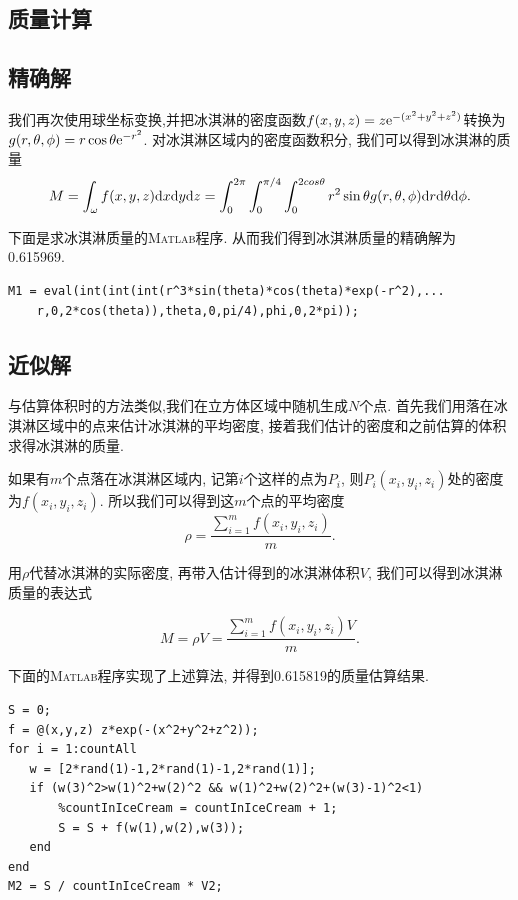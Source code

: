 \documentclass[a4paper,12pt]{article}
\begin{document}
\begin{CJK*}{UTF8}{gbsn}
\section{质量计算}
\subsection{精确解}
我们再次使用球坐标变换,并把冰淇淋的密度函数$f(x,y,z)=z{\rm e}^{-(x^2+y^2+z^2)}$转换为$g(r,\theta,\phi)=r\cos{\theta}{\rm e}^{-r^2}$. 对冰淇淋区域内的密度函数积分, 我们可以得到冰淇淋的质量
\begin{equation*}
M=\int^{}_{\omega}f(x,y,z){\rm d}x{\rm d}y{\rm d}z=\int^{2\pi}_{0}\int^{\pi/4}_{0}\int^{2cos{\theta}}_{0}r^2\sin{\theta}g(r,\theta,\phi){\rm d}r{\rm d}\theta{\rm d}\phi.
\end{equation*}\par
下面是求冰淇淋质量的\textsc{Matlab}程序. 从而我们得到冰淇淋质量的精确解为0.615969.\par\vspace{-15pt}
\begin{lstlisting}
M1 = eval(int(int(int(r^3*sin(theta)*cos(theta)*exp(-r^2),...
    r,0,2*cos(theta)),theta,0,pi/4),phi,0,2*pi));
\end{lstlisting}\par

\subsection{近似解}
与估算体积时的方法类似,我们在立方体区域中随机生成$N$个点. 首先我们用落在冰淇淋区域中的点来估计冰淇淋的平均密度, 接着我们估计的密度和之前估算的体积求得冰淇淋的质量.\par
如果有$m$个点落在冰淇淋区域内, 记第$i$个这样的点为$P_i$, 则$P_i(x_i,y_i,z_i)$处的密度为$f(x_i,y_i,z_i)$. 所以我们可以得到这$m$个点的平均密度
\begin{equation*}
\rho=\frac{\sum_{i=1}^{m}f(x_i,y_i,z_i)}{m}.
\end{equation*}\par
用$\rho$代替冰淇淋的实际密度, 再带入估计得到的冰淇淋体积$V$, 我们可以得到冰淇淋质量的表达式\par
\begin{equation*}
M=\rho V=\frac{\sum_{i=1}^{m}f(x_i,y_i,z_i)V}{m}.
\end{equation*}\par\vspace{5pt}
\noindent 下面的\textsc{Matlab}程序实现了上述算法, 并得到0.615819的质量估算结果.\par\vspace{-15pt}
\begin{lstlisting}
S = 0;
f = @(x,y,z) z*exp(-(x^2+y^2+z^2));
for i = 1:countAll
   w = [2*rand(1)-1,2*rand(1)-1,2*rand(1)];
   if (w(3)^2>w(1)^2+w(2)^2 && w(1)^2+w(2)^2+(w(3)-1)^2<1)
       %countInIceCream = countInIceCream + 1;
       S = S + f(w(1),w(2),w(3));
   end
end
M2 = S / countInIceCream * V2;
\end{lstlisting}\par

\end{CJK*}
\end{document}
